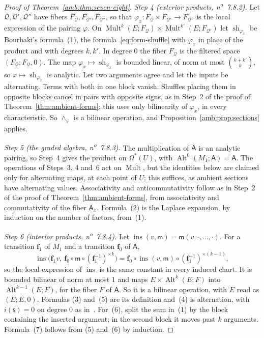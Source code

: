 \documentclass[11pt]{amsart}
\theoremstyle{definition}
\theoremstyle{remark}
\numberwithin{equation}{section}
\newcommand{\Alt}{\operatorname{Alt}}
\newcommand{\Mult}{\operatorname{Mult}}
\theoremstyle{plain}
\theoremstyle{definition}
\theoremstyle{plain}
\begin{document}
\begin{proof}[Proof of Theorem~\ref{amb:thm:seven-eight}]
\emph{Step 4 (exterior products, n\textsuperscript{o}~7.8.2).} Let $\mathcal Q,\mathcal Q',\mathcal Q''$ have fibers $F_{\mathcal Q},F_{\mathcal Q'},F_{\mathcal Q''}$, so that $\varphi_x\colon F_{\mathcal Q}\times F_{\mathcal Q'}\to F_{\mathcal Q''}$ is the local expression of the pairing $\varphi$. On $\Mult^k(E;F_{\mathcal Q})\times\Mult^{k'}(E;F_{\mathcal Q'})$ let $\operatorname{sh}_{\varphi_x}$ be Bourbaki's formula~(1), the formula~\eqref{eq:form-shuffle} with $\varphi_x$ in place of the product and with degrees $k,k'$. In degree $0$ the fiber $F_{\mathcal Q}$ is the filtered space $(F_{\mathcal Q};F_{\mathcal Q},0)$. The map $\varphi_x\mapsto\operatorname{sh}_{\varphi_x}$ is bounded linear, of norm at most $\binom{k+k'}k$, so $x\mapsto\operatorname{sh}_{\varphi_x}$ is analytic. Let two arguments agree and let the inputs be alternating. Terms with both in one block vanish. Shuffles placing them in opposite blocks cancel in pairs with opposite signs, as in Step~2 of the proof of Theorem~\ref{thm:ambient-forms}; this uses only bilinearity of $\varphi_x$, in every characteristic. So $\wedge_\varphi$ is a bilinear operation, and Proposition~\ref{amb:prop:sections} applies.

\emph{Step 5 (the graded algebra, n\textsuperscript{o}~7.8.3).} The multiplication of $\mathsf A$ is an analytic pairing, so Step~4 gives the product on $\Omega^*(U)$, with $\Alt^0(M_1;\mathsf A)=\mathsf A$. The operations of Steps~3, 4 and~6 act on $\Mult$, but the identities below are claimed only for alternating maps, at each point of $U$; this suffices, as ambient sections have alternating values. Associativity and anticommutativity follow as in Step~2 of the proof of Theorem~\ref{thm:ambient-forms}, from associativity and commutativity of the fiber $\mathsf A_x$. Formula~(2) is the Laplace expansion, by induction on the number of factors, from~(1).

\emph{Step 6 (interior products, n\textsuperscript{o}~7.8.4).} Let $\operatorname{ins}(v,\mathsf m)=\mathsf m(v,\cdot,\dots,\cdot)$. For a transition $\mathbf f_1$ of $M_1$ and a transition $\mathbf f_0$ of $\mathsf A$,
\[
 \operatorname{ins}\bigl(\mathbf f_1v,\ \mathbf f_0\circ\mathsf m\circ(\mathbf f_1^{-1})^{\times k}\bigr)=\mathbf f_0\circ\operatorname{ins}(v,\mathsf m)\circ(\mathbf f_1^{-1})^{\times(k-1)},
\]
so the local expression of $\operatorname{ins}$ is the same constant in every induced chart. It is bounded bilinear of norm at most $1$ and maps $E\times\Alt^k(E;F)$ into $\Alt^{k-1}(E;F)$, for the fiber $F$ of $\mathsf A$. So it is a bilinear operation, with $E$ read as $(E;E,0)$. Formulas (3) and~(5) are its definition and~(4) is alternation, with $i(\mathsf s)=0$ on degree $0$ as in~\cite[n\textsuperscript{o}~7.8.4]{Bou}. For~(6), split the sum in~(1) by the block containing the inserted argument; in the second block it moves past $k$ arguments. Formula~(7) follows from (5) and~(6) by induction.


\end{proof}
\end{document}
